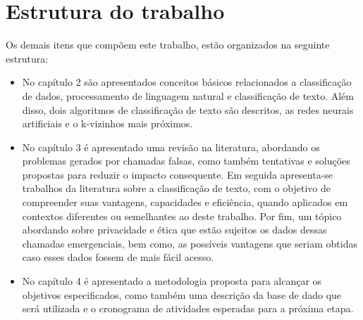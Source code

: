 \section{Estrutura do trabalho}
Os demais itens que compõem este trabalho, estão organizados na seguinte estrutura:

\begin{itemize}
    \item No capítulo 2 são apresentados conceitos básicos relacionados a classificação de dados, processamento de linguagem natural e classificação de texto. Além disso, dois algoritmos de classificação de texto são descritos, as redes neurais artificiais e o k-vizinhos mais próximos.
    \item No capítulo 3 é apresentado uma revisão na literatura, abordando os problemas gerados por chamadas falsas, como também tentativas e soluções propostas para reduzir o impacto consequente. Em seguida apresenta-se trabalhos da literatura sobre a classificação de texto, com o objetivo de compreender suas vantagens, capacidades e eficiência, quando aplicados em contextos diferentes ou semelhantes ao deste trabalho. Por fim, um tópico abordando sobre privacidade e ética que estão sujeitos os dados dessas chamadas emergenciais, bem como, as possíveis vantagens que seriam obtidas caso esses dados fossem de mais fácil acesso.
    \item No capítulo 4 é apresentado a metodologia proposta para alcançar os objetivos especificados, como também uma descrição da base de dado que será utilizada e o cronograma de atividades esperadas para a próxima etapa.
\end{itemize}